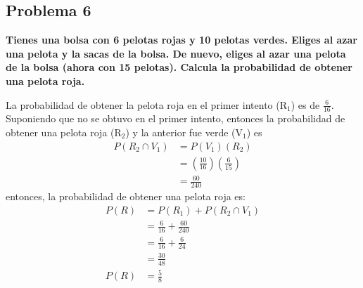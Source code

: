 \subsection*{Problema 6}
\textbf{Tienes una bolsa con 6 pelotas rojas y 10 pelotas verdes. Eliges al azar una pelota y la sacas de la bolsa. De nuevo, eliges al azar una pelota de la bolsa (ahora con 15 pelotas). Calcula la probabilidad de obtener una pelota roja.}

La probabilidad de obtener la pelota roja en el primer intento (R$_1$) es de $\frac{6}{16}$. Suponiendo que no se obtuvo en el primer intento, entonces la probabilidad de obtener una pelota roja (R$_2$) y la anterior fue verde (V$_1$) es
\begin{align*}
    P(R_2\cap V_1) & = P(V_1) (R_2)                                         \\
                   & = \left(\frac{10}{16}\right) \left(\frac{6}{15}\right) \\
                   & = \frac{60}{240}
\end{align*}
entonces, la probabilidad de obtener una pelota roja es:
\begin{align*}
    P(R) & = P(R_1) + P(R_2\cap V_1)       \\
         & = \frac{6}{16} + \frac{60}{240} \\
         & = \frac{6}{16}+ \frac{6}{24}    \\
         & = \frac{30}{48}                 \\
    P(R) & = \frac{5}{8}
\end{align*}